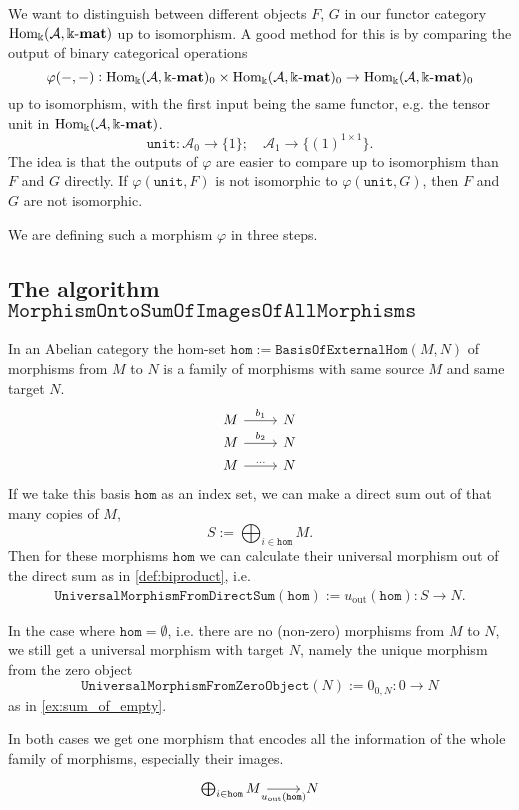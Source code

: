 
We want to distinguish between different objects $F$, $G$ in our functor category $\mathrm{Hom_{\Bbbk}}(\mathcal{A},\Bbbk\textnormal{-}\mathbf{mat})$ up to isomorphism. A good method for this is by
comparing the output of binary categorical operations
\[
\varphi( -, - ) : \mathrm{Hom_{\Bbbk}}(\mathcal{A},\Bbbk\textnormal{-}\mathbf{mat})_{0} \times \mathrm{Hom_{\Bbbk}}(\mathcal{A},\Bbbk\textnormal{-}\mathbf{mat})_{0} \rightarrow \mathrm{Hom_{\Bbbk}}(\mathcal{A},\Bbbk\textnormal{-}\mathbf{mat})_{0}
\]
up to isomorphism, with the first input being the same functor, e.g. the tensor unit in $\mathrm{Hom_{\Bbbk}}(\mathcal{A},\Bbbk\textnormal{-}\mathbf{mat})$.
\[
\mathtt{unit} : \mathcal{A}_{0} \rightarrow \{1\};\quad \mathcal{A}_{1} \rightarrow \{(1)^{1\times 1}\}.
\]
The idea is that the outputs of $\varphi$ are easier to compare up to isomorphism than $F$ and $G$ directly.
If $\varphi( \mathtt{unit}, F )$ is not isomorphic to $\varphi( \mathtt{unit}, G )$, then $F$ and $G$ are not isomorphic.

We are defining such a morphism $\varphi$ in three steps.

\subsection{The algorithm $\mathtt{MorphismOntoSumOfImagesOfAllMorphisms}$}

In an Abelian category the hom-set $\mathtt{hom} := \mathtt{BasisOfExternalHom}( M, N )$ of morphisms from $M$ to $N$ is a family of
morphisms with same source $M$ and same target $N$.
\[
\begin{tikzcd}[
  row sep=0.5ex,
]
M \arrow[r, "b_{1}"] & N \\
M \arrow[r, "b_{2}"] & N \\
M \arrow[r, "\dots"] & N
\end{tikzcd}
\]
If we take this basis $\mathtt{hom}$ as an index set, we can make a direct sum out of that many copies of $M$,
\[
S := \bigoplus_{i\in \mathtt{hom}} M.
\]
Then for these morphisms $\mathtt{hom}$ we can calculate their universal morphism out of the direct sum as in \ref{def:biproduct}, i.e.
\begin{align*}
\mathtt{UniversalMorphismFromDirectSum}( \mathtt{hom} ) := u_{\text{out}}(\mathtt{hom}) : S \rightarrow N.
\end{align*}

In the case where $\mathtt{hom} = \emptyset$, i.e. there are no (non-zero) morphisms from $M$ to $N$, we still get a
universal morphism with target $N$, namely the unique morphism from the zero object
\[
\mathtt{UniversalMorphismFromZeroObject}( N ) := 0_{0,N} : 0 \rightarrow N
\]
as in \ref{ex:sum_of_empty}.

In both cases we get one morphism that encodes all the information of the whole family of morphisms, especially their images. 
\[
\begin{tikzcd}%
\bigoplus_{i\in \mathtt{hom}} M \arrow[r, "u_{\text{out}}(\mathtt{hom})"'] & N
\end{tikzcd}
\]

